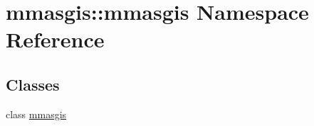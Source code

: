 \hypertarget{namespacemmasgis_1_1mmasgis}{
\section{mmasgis::mmasgis Namespace Reference}
\label{namespacemmasgis_1_1mmasgis}
}
\subsection*{Classes}
\begin{DoxyCompactItemize}
\item 
class \hyperlink{classmmasgis_1_1mmasgis_1_1mmasgis}{mmasgis}
\end{DoxyCompactItemize}
